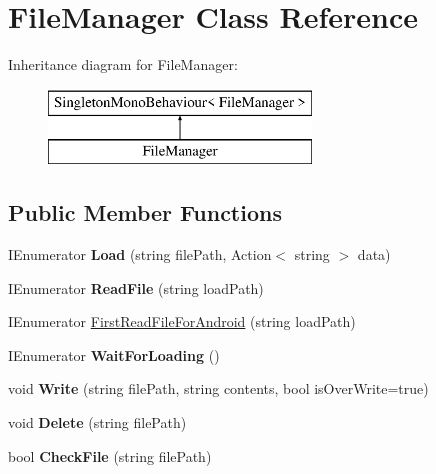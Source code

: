 \hypertarget{class_file_manager}{}\section{File\+Manager Class Reference}
\label{class_file_manager}
Inheritance diagram for File\+Manager\+:\begin{figure}[H]
\begin{center}
\leavevmode
\includegraphics[height=2.000000cm]{class_file_manager}
\end{center}
\end{figure}
\subsection*{Public Member Functions}
\begin{DoxyCompactItemize}
\item 
I\+Enumerator {\bfseries Load} (string file\+Path, Action$<$ string $>$ data)\hypertarget{class_file_manager_a769410809bea75b7c9e8c6678b9742b3}{}\label{class_file_manager_a769410809bea75b7c9e8c6678b9742b3}

\item 
I\+Enumerator {\bfseries Read\+File} (string load\+Path)\hypertarget{class_file_manager_ab9ead949d5c94557a503910e75fea2f6}{}\label{class_file_manager_ab9ead949d5c94557a503910e75fea2f6}

\item 
I\+Enumerator \hyperlink{class_file_manager_a1df651a1bceee515bb1c4c77af2f5b23}{First\+Read\+File\+For\+Android} (string load\+Path)
\item 
I\+Enumerator {\bfseries Wait\+For\+Loading} ()\hypertarget{class_file_manager_ae05627d9f9a85fe0c7448c9430a00b72}{}\label{class_file_manager_ae05627d9f9a85fe0c7448c9430a00b72}

\item 
void {\bfseries Write} (string file\+Path, string contents, bool is\+Over\+Write=true)\hypertarget{class_file_manager_a4022cf7800e48d934b7c5fb47cd8bf06}{}\label{class_file_manager_a4022cf7800e48d934b7c5fb47cd8bf06}

\item 
void {\bfseries Delete} (string file\+Path)\hypertarget{class_file_manager_ac1fc354c1a1f90f4eb5b72baac6a6e39}{}\label{class_file_manager_ac1fc354c1a1f90f4eb5b72baac6a6e39}

\item 
bool {\bfseries Check\+File} (string file\+Path)\hypertarget{class_file_manager_a04b637c2ec7e4c0f0f28e6a99c72e138}{}\label{class_file_manager_a04b637c2ec7e4c0f0f28e6a99c72e138}

\end{DoxyCompactItemize}

